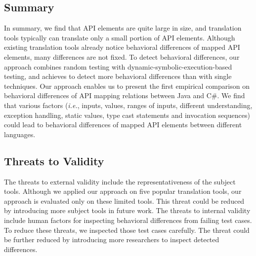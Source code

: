 \subsection{Summary}
\label{sec:evaluation:summary}
In summary, we find that API elements are quite large in size, and translation tools typically can translate only a small portion of API elements. Although existing translation tools already notice behavioral differences of mapped API elements, many differences are not fixed. To detect behavioral differences, our approach combines random testing with dynamic-symbolic-execution-based testing, and achieves to detect more behavioral differences than with single techniques. Our approach enables us to present the first empirical comparison on behavioral differences of API mapping relations between Java and C\#. We find that various factors (\emph{i.e.},  inputs,  values, ranges of inputs, different understanding, exception handling, static values, type cast statements and invocation sequences) could lead to behavioral differences of mapped API elements between different languages.
\subsection{Threats to Validity}
\label{sec:evaluation:threat}
The threats to external validity include the representativeness of the subject tools. Although we applied
our approach on five popular translation tools, our approach is evaluated only on these limited tools. This threat could be reduced by introducing more subject tools in future work. The threats to internal validity include human factors for inspecting behavioral differences from failing test cases. To reduce these threats, we inspected those test cases carefully. The threat could be further
reduced by introducing more researchers to inspect detected differences.
